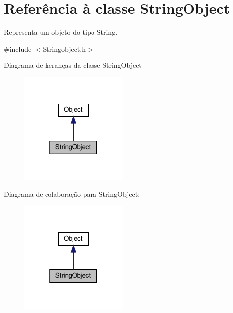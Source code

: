 \hypertarget{classStringObject}{}\section{Referência à classe String\+Object}
\label{classStringObject}


Representa um objeto do tipo String.  




{\ttfamily \#include $<$Stringobject.\+h$>$}



Diagrama de heranças da classe String\+Object
\nopagebreak
\begin{figure}[H]
\begin{center}
\leavevmode
\includegraphics[width=151pt]{classStringObject__inherit__graph}
\end{center}
\end{figure}


Diagrama de colaboração para String\+Object\+:
\nopagebreak
\begin{figure}[H]
\begin{center}
\leavevmode
\includegraphics[width=151pt]{classStringObject__coll__graph}
\end{center}
\end{figure}
